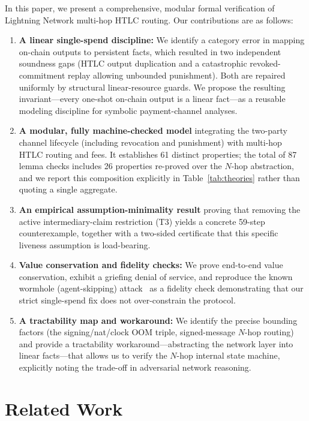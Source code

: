 \documentclass[sigconf,review]{acmart}
\theoremstyle{acmdefinition}
\begin{document}
In this paper, we present a comprehensive, modular formal verification of Lightning Network multi-hop HTLC routing. Our contributions are as follows:
\begin{enumerate}
    \item \textbf{A linear single-spend discipline:} We identify a category error in mapping on-chain outputs to persistent facts, which resulted in two independent soundness gaps (HTLC output duplication and a catastrophic revoked-commitment replay allowing unbounded punishment). Both are repaired uniformly by structural linear-resource guards. We propose the resulting invariant---every one-shot on-chain output is a linear fact---as a reusable modeling discipline for symbolic payment-channel analyses.
    \item \textbf{A modular, fully machine-checked model} integrating the two-party channel lifecycle (including revocation and punishment) with multi-hop HTLC routing and fees. It establishes 61 distinct properties; the total of 87 lemma checks includes 26 properties re-proved over the $N$-hop abstraction, and we report this composition explicitly in Table~\ref{tab:theories} rather than quoting a single aggregate.
    \item \textbf{An empirical assumption-minimality result} proving that removing the active intermediary-claim restriction (T3) yields a concrete 59-step counterexample, together with a two-sided certificate that this specific liveness assumption is load-bearing.
    \item \textbf{Value conservation and fidelity checks:} We prove end-to-end value conservation, exhibit a griefing denial of service, and reproduce the known wormhole (agent-skipping) attack~\cite{malavolta2019anonymous, smith2022modelling} as a fidelity check demonstrating that our strict single-spend fix does not over-constrain the protocol.
    \item \textbf{A tractability map and workaround:} We identify the precise bounding factors (the signing/nat/clock OOM triple, signed-message $N$-hop routing) and provide a tractability workaround---abstracting the network layer into linear facts---that allows us to verify the $N$-hop internal state machine, explicitly noting the trade-off in adversarial network reasoning.
\end{enumerate}

\section{Related Work}
\end{document}
